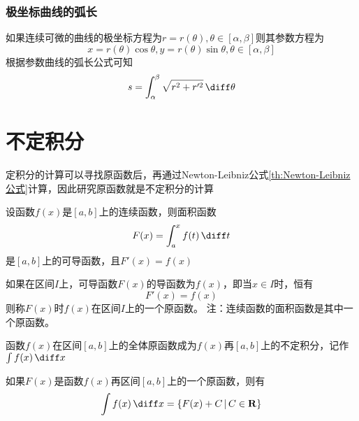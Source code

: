 \subsubsection{极坐标曲线的弧长}
如果连续可微的曲线的极坐标方程为$r=r(\theta),\theta\in[\alpha,\beta]$则其参数方程为
\[ x = r(\theta)\cos\theta,y=r(\theta)\sin\theta,\theta\in[\alpha,\beta] \]
根据参数曲线的弧长公式可知
\[ s = \int_\alpha^\beta \sqrt{r^2+r'^2}\,\diff\theta \]

\section{不定积分}
定积分的计算可以寻找原函数后，再通过Newton-Leibniz公式\ref{th:Newton-Leibniz公式}计算，因此研究原函数就是不定积分的计算
\begin{definition}
    设函数$f(x)$是$[a,b]$上的连续函数，则面积函数
    \[ F(x) = \int_a^x f(t)\,\diff t \]
    是$[a,b]$上的可导函数，且$F'(x)=f(x)$
\end{definition}
\begin{definition}
    如果在区间$I$上，可导函数$F(x)$的导函数为$f(x)$，即当$x\in I$时，恒有
    \[ F'(x) = f(x) \]
    则称$F(x)$时$f(x)$在区间$I$上的一个原函数。
    注：连续函数的面积函数是其中一个原函数。
\end{definition}
\begin{definition}
    函数$f(x)$在区间$[a,b]$上的全体原函数成为$f(x)$再$[a,b]$上的不定积分，记作$\int f(x)\,\diff x$

    如果$F(x)$是函数$f(x)$再区间$[a,b]$上的一个原函数，则有
    \[\int f(x)\,\diff x = \left\{F(x)+C \,\middle|\, C\in\mathbf{R} \right\} \]
\end{definition}

